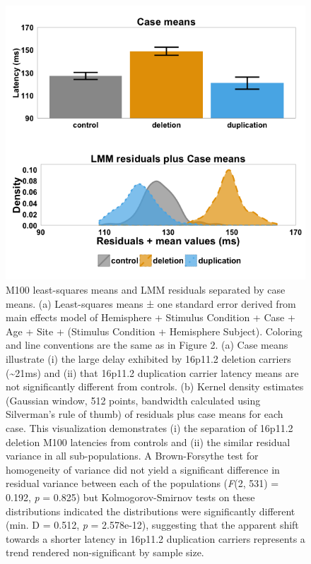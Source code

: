 \documentclass[]{article}
\begin{document}
\begin{figure}[htbp]
\centering
\includegraphics{figure-3-resubmission.png}
\caption{M100 least-squares means and LMM residuals separated by case
means. (a) Least-squares means ± one standard error derived from main
effects model of Hemisphere + Stimulus Condition + Case + Age + Site +
(Stimulus Condition + Hemisphere \textbar{} Subject). Coloring and line
conventions are the same as in Figure 2. (a) Case means illustrate (i)
the large delay exhibited by 16p11.2 deletion carriers
(\textasciitilde{}21ms) and (ii) that 16p11.2 duplication carrier
latency means are not significantly different from controls. (b) Kernel
density estimates (Gaussian window, 512 points, bandwidth calculated
using Silverman's rule of thumb) of residuals plus case means for each
case. This visualization demonstrates (i) the separation of 16p11.2
deletion M100 latencies from controls and (ii) the similar residual
variance in all sub-populations. A Brown-Forsythe test for homogeneity
of variance did not yield a significant difference in residual variance
between each of the populations (\emph{F}(2, 531) = 0.192, \emph{p} =
0.825) but Kolmogorov-Smirnov tests on these distributions indicated the
distributions were significantly different (min. D = 0.512, \emph{p} =
2.578e-12), suggesting that the apparent shift towards a shorter latency
in 16p11.2 duplication carriers represents a trend rendered
non-significant by sample size.}
\end{figure}
\end{document}
